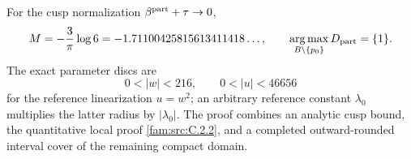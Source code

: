 \begin{theorem}\hypertarget{tag-01QL}{}\label{fam:src:C.2.3}\label{fam:st:C.2.3}\label{ari:C.8.5}\label{push:src:E.4.3}

For the cusp normalization $\beta^{\rm part}+\tau\to0$,
\[
 M=-\frac3\pi\log6=-1.71100425815613411418\ldots,
 \qquad \operatorname*{arg\,max}_{B\setminus\{p_0\}}D_{\rm part}=\{1\}.
\]
The exact parameter discs are
\[
 0<|w|<216,
 \qquad 0<|u|<46656
\]
for the reference linearization $u=w^2$; an arbitrary reference constant
$\lambda_0$ multiplies the latter radius by $|\lambda_0|$.
The proof combines an analytic cusp bound, the quantitative local proof
\ref{fam:src:C.2.2}, and a completed outward-rounded interval cover of the remaining
compact domain.
\end{theorem}


